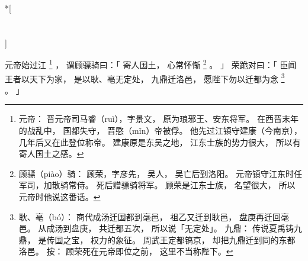 
\switchcolumn[0]*[\section{}]

元帝始过江%
\footnote{%
    元帝：
        晋元帝司马睿（ruì），字景文，
        原为琅邪王、安东将军。
        在西晋末年的战乱中，
        国都失守，
        晋愍（mǐn）帝被俘。
        他先过江镇守建康（今南京），
        几年后又在此登位称帝。
        建康原是东吴之地，
        江东士族的势力很大，
        所以有寄人国土之感。
}%
，
谓顾骠骑曰：「
    寄人国土，
    心常怀惭%
    \footnote{%
        顾骠（piào）骑：
            顾荣，字彦先，
            吴人，
            吴亡后到洛阳。
            元帝镇守江东时任军司，加散骑常侍。
            死后赠骠骑将军。
            顾荣是江东士族，
            名望很大，
            所以元帝时他说这番话。
    }%
    。
」
荣跪对曰：「
    臣闻王者以天下为家，
    是以耿、亳无定处，
    九鼎迁洛邑，
    愿陛下勿以迁都为念%
    \footnote{%
        耿、亳（bó）：
            商代成汤迁国都到毫邑，
            祖乙又迁到耿邑，
            盘庚再迁回毫邑。
            从成汤到盘庚，
            共迁都五次，
            所以说「无定处」。
        九鼎：
            传说夏禹铸九鼎，
            是传国之宝，
            权力的象征。
            周武王定都镐京，
            却把九鼎迁到同的东都洛邑。
        按：
            顾荣死在元帝即位之前，
            这里不当称陛下。
    }%
    。
」

\switchcolumn


